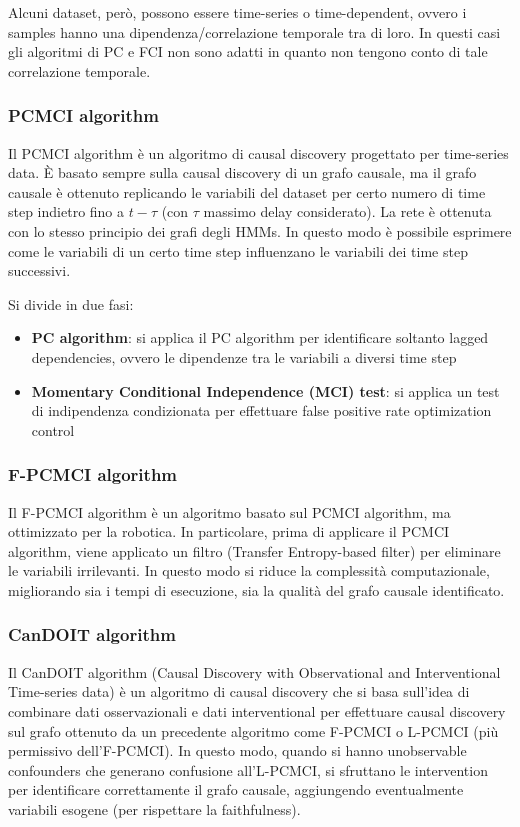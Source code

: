 Alcuni dataset, però, possono essere time-series o time-dependent, ovvero i samples hanno una dipendenza/correlazione
temporale tra di loro. In questi casi gli algoritmi di PC e FCI non sono adatti in quanto non tengono conto di tale
correlazione temporale.

\subsubsection*{PCMCI algorithm}
Il PCMCI algorithm è un algoritmo di causal discovery progettato per time-series data. È basato sempre sulla causal discovery
di un grafo causale, ma il grafo causale è ottenuto replicando le variabili del dataset per certo numero di time step indietro
fino a \(t-\tau\) (con \(\tau\) massimo delay considerato). La rete è ottenuta con lo stesso principio dei grafi degli HMMs.
In questo modo è possibile esprimere come le variabili di un certo time step influenzano le variabili dei time step successivi.

Si divide in due fasi:
\begin{itemize}
	\item \textbf{PC algorithm}: si applica il PC algorithm per identificare soltanto lagged dependencies, ovvero le dipendenze
	tra le variabili a diversi time step
	\item \textbf{Momentary Conditional Independence (MCI) test}: si applica un test di indipendenza condizionata per effettuare
	false positive rate optimization control
\end{itemize}

\subsubsection*{F-PCMCI algorithm}
Il F-PCMCI algorithm è un algoritmo basato sul PCMCI algorithm, ma ottimizzato per la robotica. In particolare, prima di applicare
il PCMCI algorithm, viene applicato un filtro (Transfer Entropy-based filter) per eliminare le variabili irrilevanti. In questo
modo si riduce la complessità computazionale, migliorando sia i tempi di esecuzione, sia la qualità del grafo causale identificato.

\subsubsection*{CanDOIT algorithm}
Il CanDOIT algorithm (Causal Discovery with Observational and Interventional Time-series data) è un algoritmo di causal discovery
che si basa sull'idea di combinare dati osservazionali e dati interventional per effettuare causal discovery sul grafo ottenuto
da un precedente algoritmo come F-PCMCI o L-PCMCI (più permissivo dell'F-PCMCI). In questo modo, quando si hanno unobservable
confounders che generano confusione all'L-PCMCI, si sfruttano le intervention per identificare correttamente il grafo causale,
aggiungendo eventualmente variabili esogene (per rispettare la faithfulness).

